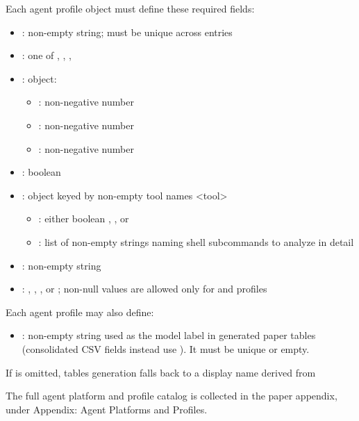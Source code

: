 \documentclass[11pt]{article}
\begin{document}
Each agent profile object must define these required fields:
\begin{itemize}
\item {}: non-empty string; must be unique across entries
\item {}: one of , , , 
\item {}: object:
\begin{itemize}
    \item {}: non-negative number
    \item {}: non-negative number
    \item {}: non-negative number
\end{itemize}
\item {}: boolean
\item {}: object keyed by non-empty tool names <tool>
\begin{itemize}
\item {}: either boolean , , or 
\item {}: list of non-empty strings naming shell subcommands to analyze in detail
\end{itemize}
\item {}: non-empty string
\item {}: , , , or ; non-null values are allowed only for  and  profiles
\end{itemize}

Each agent profile may also define:
\begin{itemize}
\item {}: non-empty string used as the model label in generated paper  tables  (consolidated CSV  fields instead use ). It must be unique or empty.
\end{itemize}

If  is omitted,  tables generation falls back to a display name derived from 

The full agent platform and profile catalog is collected in the paper appendix, under Appendix: Agent Platforms and Profiles.
\end{document}

